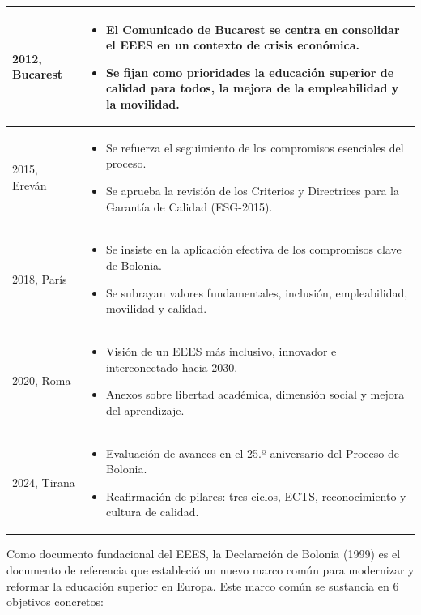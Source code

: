 \documentclass[
  11pt,
  a4paper,
  twoside]{scrreprt}
\begin{document}
\begin{longtable}{p{3cm} p{11.5cm}}
2012, Bucarest &
\begin{itemize}
\item El Comunicado de Bucarest se centra en consolidar el EEES en un contexto de crisis económica.
\item Se fijan como prioridades la educación superior de calidad para todos, la mejora de la empleabilidad y la movilidad.
\end{itemize}
\\ \hline

2015, Ereván &
\begin{itemize}
\item Se refuerza el seguimiento de los compromisos esenciales del proceso.
\item Se aprueba la revisión de los Criterios y Directrices para la Garantía de Calidad (ESG-2015).
\end{itemize}
\\ \hline

2018, París &
\begin{itemize}
\item Se insiste en la aplicación efectiva de los compromisos clave de Bolonia.
\item Se subrayan valores fundamentales, inclusión, empleabilidad, movilidad y calidad.
\end{itemize}
\\ \hline

2020, Roma &
\begin{itemize}
\item Visión de un EEES más inclusivo, innovador e interconectado hacia 2030.
\item Anexos sobre libertad académica, dimensión social y mejora del aprendizaje.
\end{itemize}
\\ \hline

2024, Tirana &
\begin{itemize}
\item Evaluación de avances en el 25.º aniversario del Proceso de Bolonia.
\item Reafirmación de pilares: tres ciclos, ECTS, reconocimiento y cultura de calidad.
\end{itemize}
\\ \hline

\end{longtable}

Como documento fundacional del EEES, la Declaración de Bolonia (1999) es
el documento de referencia que estableció un nuevo marco común para
modernizar y reformar la educación superior en Europa. Este marco común
se sustancia en 6 objetivos concretos:
\end{document}
